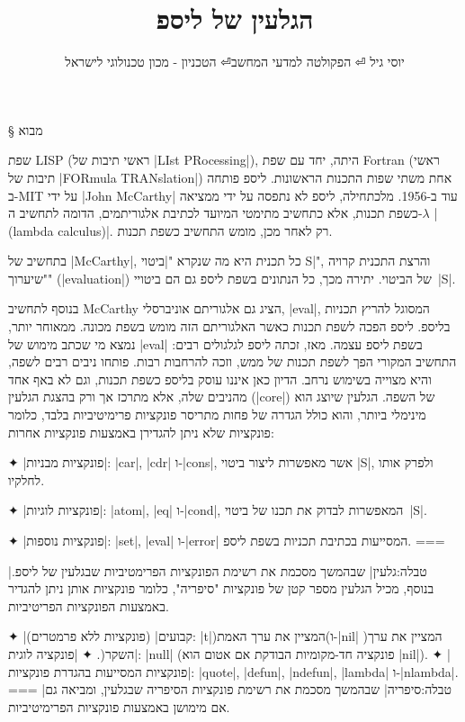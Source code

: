 \documentclass[a4paper,12pt,reqno]{article}
\title{הגלעין של ליספ}
\author{יוסי גיל ⏎ הפקולטה למדעי המחשב⏎ הטכניון - מכון טכנולוגי לישראל}
\begin{document}
\maketitle

§ מבוא

שפת LISP (ראשי תיבות של \E|LIst PRocessing|), היתה, יחד עם שפת Fortran (ראשי
תיבות של \E|FORmula TRANslation|) אחת משתי שפות התכנות הראשונות. ליספ פותחה
ב-MIT על ידי \E|John McCarthy| עוד ב-1956. מלכתחילה, ליספ לא נתפסה על ידי
ממציאה כשפת תכנות, אלא כתחשיב מתימטי המיועד לכתיבת אלגוריתמים, הדומה לתחשיב
ה-$λ$ \E|(lambda calculus)|. רק לאחר מכן, מומש התחשיב כשפת תכנות.

בתחשיב של \E|McCarthy|, כל תכנית היא מה שנקרא "\ע|ביטוי S|", והרצת התכנית קרויה
"שיערוך" (\E|evaluation|) של הביטוי. יתירה מכך, כל הנתונים בשפת ליספ גם הם
ביטויי~\E|S|.

בנוסף לתחשיב McCarthy הציג גם אלגוריתם אוניברסלי, \E|eval|, המסוגל להריץ תכניות
בליספ. ליספ הפכה לשפת תכנות כאשר האלגוריתם הזה מומש בשפת מכונה. ממאוחר יותר,
נמצא מי שכתב מימוש של \E|eval| בשפת ליספ עצמה. מאז, זכתה ליספ לגלגולים רבים:
התחשיב המקורי הפך לשפת תכנות של ממש, וזכה להרחבות רבות. פותחו ניבים רבים לשפה,
והיא מצוייה בשימוש נרחב. הדיון כאן איננו עוסק בליספ כשפת תכנות, וגם לא באף אחד
מהניבים שלה, אלא מתרכז אך ורק בהצגת הגלעין (\E|core|) של השפה. הגלעין שיוצג הוא
מינימלי ביותר, והוא כולל הגדרה של פחות מתריסר פונקציות פרימיטיביות בלבד, כלומר
פונקציות שלא ניתן להגדירן באמצעות פונקציות אחרות:

✦ \ע|פונקציות מבניות|: \E|car|, \E|cdr| ו-\E|cons|, אשר מאפשרות ליצור ביטוי
\E|S|, ולפרק אותו לחלקיו.

✦ \ע|פונקציות לוגיות|: \E|atom|, \E|eq| ו-\E|cond|, המאפשרות לבדוק את תכנו של
ביטוי~\E|S|.

✦ \ע|פונקציות נוספות|: \E|set|, \E|eval| ו-\E|error| המסייעות בכתיבת
תכניות בשפת ליספ.
===

|טבלה:גלעין| שבהמשך מסכמת את רשימת הפונקציות הפרימטיביות שבגלעין של ליספ.
בנוסף, מכיל הגלעין מספר קטן של פונקציות "סיפריה", כלומר פונקציות
אותן ניתן להגדיר באמצעות הפונקציות הפריטיביות.

✦ \ע|קבועים| (פונקציות ללא פרמטרים): \E|t|)המציין את ערך האמת(ו-\E|nil|
)המציין את ערך השקר(.
✦ \ע|פונקציה לוגית|: \E|null| (פונקציה חד-מקומיות הבודקת אם אטום הוא \E|nil|).
✦ \ע| פונקציות המסייעות בהגדרת פונקציות|:
\E|quote|, \E|defun|, \E|ndefun|, \E|lambda| ו-\E|nlambda|.
===
|טבלה:סיפריה| שבהמשך מסכמת את רשימת פונקציות הסיפריה שבגלעין, ומביאה גם
אם מימושן באמצעות פונקציות הפרימיטיביות.
\end{document}
